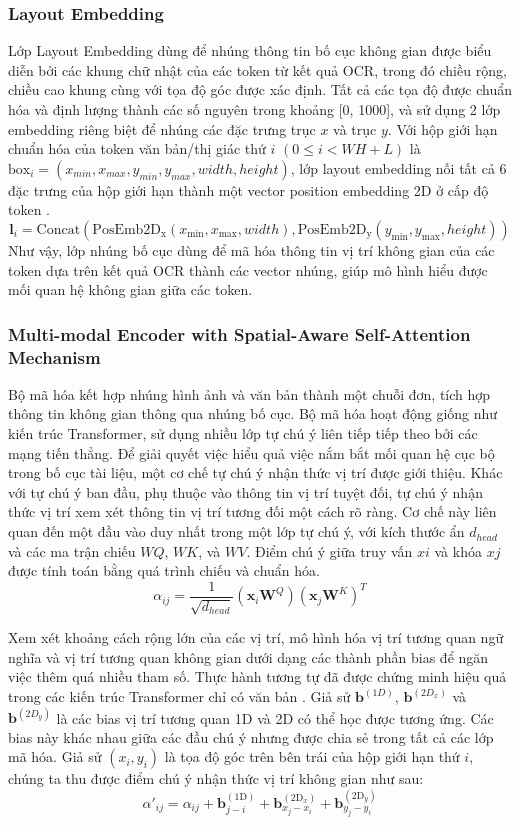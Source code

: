 \subsubsection*{Layout Embedding}
Lớp Layout Embedding dùng để nhúng thông tin bố cục không gian được biểu diễn bởi các khung chữ nhật của các token từ kết quả OCR, trong đó chiều rộng, chiều cao khung cùng với tọa độ góc được xác định. Tất cả các tọa độ được chuẩn hóa và định lượng thành các số nguyên trong khoảng [0, 1000], và sử dụng 2 lớp embedding riêng biệt để nhúng các đặc trưng trục $x$ và trục $y$. Với hộp giới hạn chuẩn hóa của token văn bản/thị giác thứ $i$ $(0 \leq i < W H + L)$ là $\text{box}_i = (x_{min}, x_{max}, y_{min}, y_{max}, width, height)$, lớp layout embedding nối tất cả 6 đặc trưng của hộp giới hạn thành một vector position embedding 2D ở cấp độ token \cite{xu2022layoutlmv2}.
\[
    \mathbf{l}_i = \text{Concat}(\text{PosEmb2D}_\text{x}(x_{\text{min}}, x_{\text{max}}, width), \text{PosEmb2D}_{\text{y}}(y_{\text{min}}, y_{\text{max}}, height))
\]
Như vậy, lớp nhúng bố cục dùng để mã hóa thông tin vị trí không gian của các token dựa trên kết quả OCR thành các vector nhúng, giúp mô hình hiểu được mối quan hệ không gian giữa các token.

\subsubsection*{Multi-modal Encoder with Spatial-Aware Self-Attention Mechanism}
Bộ mã hóa kết hợp nhúng hình ảnh và văn bản thành một chuỗi đơn, tích hợp thông tin không gian thông qua nhúng bố cục. Bộ mã hóa hoạt động giống như kiến trúc Transformer, sử dụng nhiều lớp tự chú ý liên tiếp tiếp theo bởi các mạng tiến thẳng. Để giải quyết việc hiểu quả việc nắm bắt mối quan hệ cục bộ trong bố cục tài liệu, một cơ chế tự chú ý nhận thức vị trí được giới thiệu. Khác với tự chú ý ban đầu, phụ thuộc vào thông tin vị trí tuyệt đối, tự chú ý nhận thức vị trí xem xét thông tin vị trí tương đối một cách rõ ràng. Cơ chế này liên quan đến một đầu vào duy nhất trong một lớp tự chú ý, với kích thước ẩn $d_{head}$ và các ma trận chiếu $WQ$, $WK$, và $WV$. Điểm chú ý giữa truy vấn $xi$ và khóa $xj$ được tính toán bằng quá trình chiếu và chuẩn hóa.
\[
    \alpha_{ij} = \frac{1}{\sqrt{d_{head}}}(\mathbf{x}_i \mathbf{W}^Q) (\mathbf{x}_j \mathbf{W}^K)^T
\]

Xem xét khoảng cách rộng lớn của các vị trí, mô hình hóa vị trí tương quan ngữ nghĩa và vị trí tương quan không gian dưới dạng các thành phần bias để ngăn việc thêm quá nhiều tham số. Thực hành tương tự đã được chứng minh hiệu quả trong các kiến trúc Transformer chỉ có văn bản \cite{vaswani2023attention}. Giả sử $\mathbf{b}^{(1D)}$, $\mathbf{b}^{(2D_x)}$ và $\mathbf{b}^{(2D_y)}$ là các bias vị trí tương quan 1D và 2D có thể học được tương ứng. Các bias này khác nhau giữa các đầu chú ý nhưng được chia sẻ trong tất cả các lớp mã hóa. Giả sử $(x_i, y_i)$ là tọa độ góc trên bên trái của hộp giới hạn thứ $i$, chúng ta thu được điểm chú ý nhận thức vị trí không gian như sau:
\[
    \alpha'_{ij} = \alpha_{ij} + \mathbf{b}_{j-i}^{(1\text{D})} + \mathbf{b}_{x_j-x_i}^{(2\text{D}_x)} + \mathbf{b}_{y_j-y_i}^{(2\text{D}_y)}
\]

